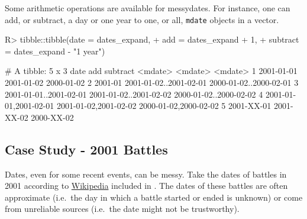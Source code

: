 \documentclass[
]{jss}
\begin{document}
Some arithmetic operations are available for messydates. For instance,
one can add, or subtract, a day or one year to one, or all,
\texttt{mdate} objects in a vector.

\begin{CodeChunk}
\begin{CodeInput}
R> tibble::tibble(date = dates_expand,
+                add = dates_expand + 1,
+                subtract = dates_expand - "1 year")
\end{CodeInput}
\begin{CodeOutput}
# A tibble: 5 x 3
  date                    add                     subtract               
  <mdate>                 <mdate>                 <mdate>                
1 2001-01-01              2001-01-02              2000-01-02             
2 2001-01                 2001-01-02..2001-02-01  2000-01-02..2000-02-01 
3 2001-01-01..2001-02-01  2001-01-02..2001-02-02  2000-01-02..2000-02-02 
4 {2001-01-01,2001-02-01} {2001-01-02,2001-02-02} {2000-01-02,2000-02-02}
5 2001-XX-01              2001-XX-02              2000-XX-02             
\end{CodeOutput}
\end{CodeChunk}

\hypertarget{case-study---2001-battles}{%
\subsection{Case Study - 2001 Battles}\label{case-study---2001-battles}}

Dates, even for some recent events, can be messy. Take the dates of
battles in 2001 according to
\href{https://en.wikipedia.org/wiki/List_of_battles_in_the_21st_century}{Wikipedia}
included in . The dates of these battles are often
approximate (i.e.~the day in which a battle started or ended is unknown)
or come from unreliable sources (i.e.~the date might not be
trustworthy).
\end{document}
